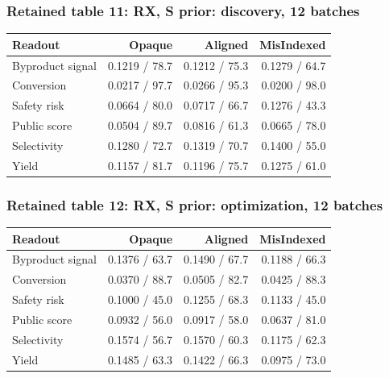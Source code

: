 \documentclass[10pt,a4paper]{article}
\begin{document}
\subsubsection{Retained table 11: RX, S prior: discovery, 12 batches}\label{retained-table-11-rx-s-prior-discovery-12-batches}

{\def\LTcaptype{table} %
\small\begin{longtable}[]{@{}lrrr@{}}
\toprule\noalign{}
Readout & Opaque & Aligned & MisIndexed \\
\midrule\noalign{}
\endhead
\bottomrule\noalign{}
\endlastfoot
Byproduct signal & 0.1219 / 78.7 & 0.1212 / 75.3 & 0.1279 / 64.7 \\
Conversion & 0.0217 / 97.7 & 0.0266 / 95.3 & 0.0200 / 98.0 \\
Safety risk & 0.0664 / 80.0 & 0.0717 / 66.7 & 0.1276 / 43.3 \\
Public score & 0.0504 / 89.7 & 0.0816 / 61.3 & 0.0665 / 78.0 \\
Selectivity & 0.1280 / 72.7 & 0.1319 / 70.7 & 0.1400 / 55.0 \\
Yield & 0.1157 / 81.7 & 0.1196 / 75.7 & 0.1275 / 61.0 \\
\end{longtable}\normalsize
}

\subsubsection{Retained table 12: RX, S prior: optimization, 12 batches}\label{retained-table-12-rx-s-prior-optimization-12-batches}

{\def\LTcaptype{table} %
\small\begin{longtable}[]{@{}lrrr@{}}
\toprule\noalign{}
Readout & Opaque & Aligned & MisIndexed \\
\midrule\noalign{}
\endhead
\bottomrule\noalign{}
\endlastfoot
Byproduct signal & 0.1376 / 63.7 & 0.1490 / 67.7 & 0.1188 / 66.3 \\
Conversion & 0.0370 / 88.7 & 0.0505 / 82.7 & 0.0425 / 88.3 \\
Safety risk & 0.1000 / 45.0 & 0.1255 / 68.3 & 0.1133 / 45.0 \\
Public score & 0.0932 / 56.0 & 0.0917 / 58.0 & 0.0637 / 81.0 \\
Selectivity & 0.1574 / 56.7 & 0.1570 / 60.3 & 0.1175 / 62.3 \\
Yield & 0.1485 / 63.3 & 0.1422 / 66.3 & 0.0975 / 73.0 \\
\end{longtable}\normalsize
}
\end{document}

